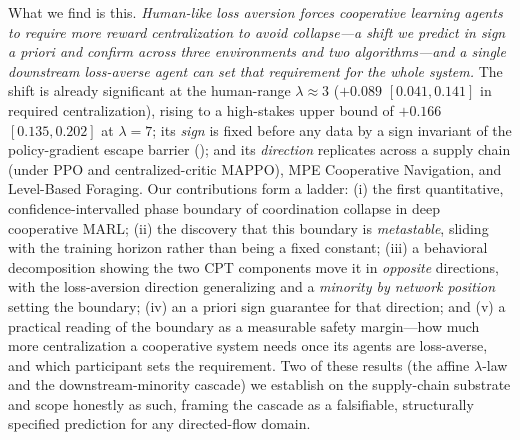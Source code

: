 What we find is this.
\emph{Human-like loss aversion forces cooperative learning agents to require more
reward centralization to avoid collapse---a shift we predict in sign a priori and
confirm across three environments and two algorithms---and a single downstream
loss-averse agent can set that requirement for the whole system.} The shift is
already significant at the human-range $\lambda\!\approx\!3$
($+0.089$ $[0.041,0.141]$ in required centralization), rising to a high-stakes
upper bound of $+0.166$ $[0.135,0.202]$ at $\lambda{=}7$; its \emph{sign} is fixed
before any data by a sign invariant of the policy-gradient escape barrier
(); and its \emph{direction} replicates across a supply chain
(under PPO and centralized-critic MAPPO), MPE Cooperative Navigation, and
Level-Based Foraging. Our contributions form a ladder: (i) the first
quantitative, confidence-intervalled phase boundary of coordination collapse in
deep cooperative MARL; (ii) the discovery that this boundary is \emph{metastable},
sliding with the training horizon rather than being a fixed constant; (iii) a
behavioral decomposition showing the two CPT components move it in \emph{opposite}
directions, with the loss-aversion direction generalizing and a \emph{minority by
network position} setting the boundary; (iv) an a priori sign guarantee for that
direction; and (v) a practical reading of the boundary as a measurable safety
margin---how much more centralization a cooperative system needs once its agents
are loss-averse, and which participant sets the requirement. Two of these results
(the affine $\lambda$-law and the downstream-minority cascade) we establish on the
supply-chain substrate and scope honestly as such, framing the cascade as a
falsifiable, structurally specified prediction for any directed-flow domain.
